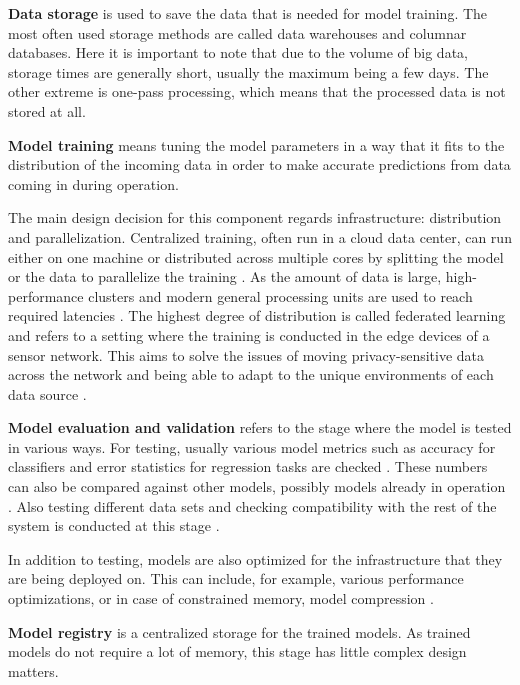 \textbf{Data storage} is used to save the data that is needed for model training. The most often used storage methods are called data warehouses and columnar databases. Here it is important to note that due to the volume of big data, storage times are generally short, usually the maximum being a few days. The other extreme is one-pass processing, which means that the processed data is not stored at all.

\textbf{Model training} means tuning the model parameters in a way that it fits to the distribution of the incoming data in order to make accurate predictions from data coming in during operation.

The main design decision for this component regards infrastructure: distribution and parallelization. Centralized training, often run in a cloud data center, can run either on one machine or distributed across multiple cores by splitting the model or the data to parallelize the training \cite{ben-nunDemystifyingParallelDistributed2019}. As the amount of data is large, high-performance clusters and modern general processing units are used to reach required latencies \cite{iotsurvey}. The highest degree of distribution is called federated learning and refers to a setting where the training is conducted in the edge devices of a sensor network. This aims to solve the issues of moving privacy-sensitive data across the network and being able to adapt to the unique environments of each data source \cite{iotsurvey}.

\textbf{Model evaluation and validation} refers to the stage where the model is tested in various ways. For testing, usually various model metrics such as accuracy for classifiers and error statistics for regression tasks are checked \cite{iotsurvey}. These numbers can also be compared against other models, possibly models already in operation \cite{googlemlops}. Also testing different data sets and checking compatibility with the rest of the system is conducted at this stage \cite{googlemlops}.

In addition to testing, models are also optimized for the infrastructure that they are being deployed on. This can include, for example, various performance optimizations, or in case of constrained memory, model compression \cite{iotsurvey}.

\textbf{Model registry} is a centralized storage for the trained models. As trained models do not require a lot of memory, this stage has little complex design matters.

